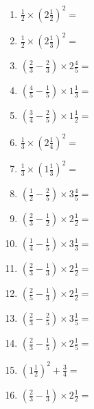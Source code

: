 \documentclass[12pt]{article}
\begin{document}
\begin{enumerate}
\item \large $ \frac{1}{2} \times \left( 2 \frac{1}{2} \right)^2 = $ \vspace{1.6cm}
\item \large $ \frac{1}{2} \times \left( 2 \frac{1}{3} \right)^2 = $ \vspace{1.6cm}
\item \large $ \left( \frac{2}{3} - \frac{2}{3} \right) \times 2 \frac{4}{5} = $ \vspace{1.6cm}
\item \large $ \left( \frac{4}{5} - \frac{1}{5} \right) \times 1 \frac{1}{3} = $ \vspace{1.6cm}
\item \large $ \left( \frac{3}{4} - \frac{2}{5} \right) \times 1 \frac{1}{2} = $ \vspace{1.6cm}
\item \large $ \frac{1}{3} \times \left( 2 \frac{1}{4} \right)^2 = $ \vspace{1.6cm}
\newpage
\item \large $ \frac{1}{3} \times \left( 1 \frac{1}{3} \right)^2 = $ \vspace{1.6cm}
\item \large $ \left( \frac{1}{2} - \frac{2}{5} \right) \times 3 \frac{4}{5} = $ \vspace{1.6cm}
\item \large $ \left( \frac{2}{3} - \frac{1}{2} \right) \times 2 \frac{1}{2} = $ \vspace{1.6cm}
\item \large $ \left( \frac{1}{4} - \frac{1}{5} \right) \times 3 \frac{1}{3} = $ \vspace{1.6cm}
\item \large $ \left( \frac{2}{3} - \frac{1}{3} \right) \times 2 \frac{1}{2} = $ \vspace{1.6cm}
\item \large $ \left( \frac{2}{5} - \frac{1}{3} \right) \times 2 \frac{1}{2} = $ \vspace{1.6cm}
\item \large $ \left( \frac{2}{3} - \frac{2}{5} \right) \times 3 \frac{1}{5} = $ \vspace{1.6cm}
\item \large $ \left( \frac{2}{3} - \frac{1}{5} \right) \times 2 \frac{1}{5} = $ \vspace{1.6cm}
\item \large $ \left( 1 \frac{1}{2} \right)^2 + \frac{3}{4} = $ \vspace{1.6cm}
\item \large $ \left( \frac{2}{3} - \frac{1}{3} \right) \times 2 \frac{1}{2} = $ \vspace{1.6cm}

\end{enumerate}
\end{document}
